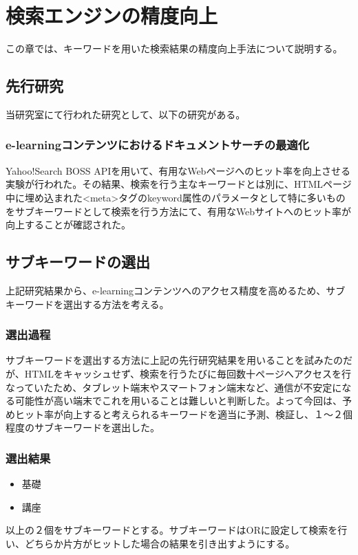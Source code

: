 \chapter{検索エンジンの精度向上}
\label{chap:search}

この章では、キーワードを用いた検索結果の精度向上手法について説明する。

\section{先行研究}
当研究室にて行われた研究として、以下の研究がある。

\subsection{e-learningコンテンツにおけるドキュメントサーチの最適化\cite{docsearch}}
Yahoo!Search BOSS APIを用いて、有用なWebページへのヒット率を向上させる実験が行われた。その結果、検索を行う主なキーワードとは別に、HTMLページ中に埋め込まれた<meta>タグのkeyword属性のパラメータとして特に多いものをサブキーワードとして検索を行う方法にて、有用なWebサイトへのヒット率が向上することが確認された。

\section{サブキーワードの選出}
上記研究結果から、e-learningコンテンツへのアクセス精度を高めるため、サブキーワードを選出する方法を考える。

\subsection{選出過程}
サブキーワードを選出する方法に上記の先行研究結果を用いることを試みたのだが、HTMLをキャッシュせず、検索を行うたびに毎回数十ページへアクセスを行なっていたため、タブレット端末やスマートフォン端末など、通信が不安定になる可能性が高い端末でこれを用いることは難しいと判断した。よって今回は、予めヒット率が向上すると考えられるキーワードを適当に予測、検証し、１〜２個程度のサブキーワードを選出した。

\subsection{選出結果}
\begin{itemize}
\item 基礎
\item 講座
\end{itemize}
以上の２個をサブキーワードとする。サブキーワードはORに設定して検索を行い、どちらか片方がヒットした場合の結果を引き出すようにする。